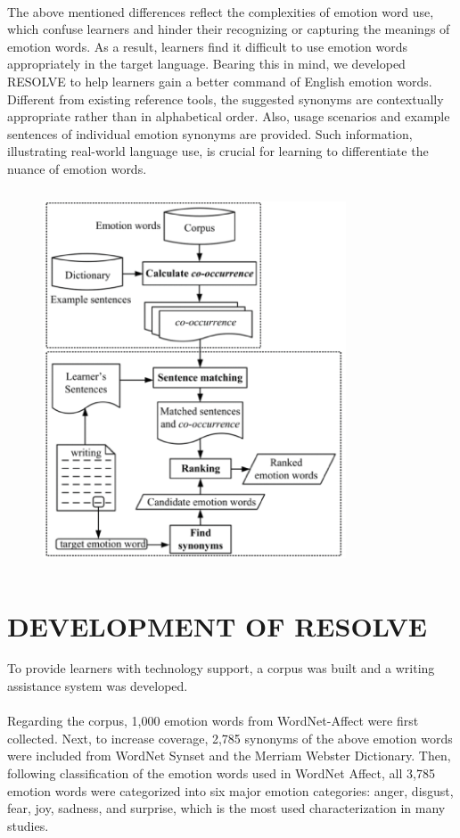 \documentclass[a4paper,12pt,oneside]{article}
\begin{document}
\paragraph{}
The above mentioned differences reflect the complexities of emotion word use, which confuse learners and hinder their recognizing or capturing the meanings of emotion words. As a result, learners find it difficult to use emotion words appropriately in the target language. Bearing this in mind, we developed RESOLVE to help learners gain a better command of English emotion words. Different from existing reference tools, the suggested synonyms are contextually appropriate rather than in alphabetical order. Also, usage scenarios and example sentences of individual emotion synonyms are provided. Such information, illustrating real-world language use, is crucial for learning to differentiate the nuance of emotion words. 


\begin{figure}[H]
\includegraphics[height=11.25cm,width=9cm]{Figure1.png}
\centering
\end{figure}

\newpage
\section{DEVELOPMENT OF RESOLVE}
To provide learners with technology support, a corpus was built and a writing assistance system was developed. 
\paragraph{}
Regarding the corpus, 1,000 emotion words from WordNet-Affect were first collected. Next, to increase coverage, 2,785 synonyms of the above emotion words were included from WordNet Synset and the Merriam Webster Dictionary. Then, following classification of the emotion words used in WordNet Affect, all 3,785 emotion words were categorized into six major emotion categories: anger, disgust, fear, joy, sadness, and surprise, which is the most used characterization in many studies. 
\end{document}
